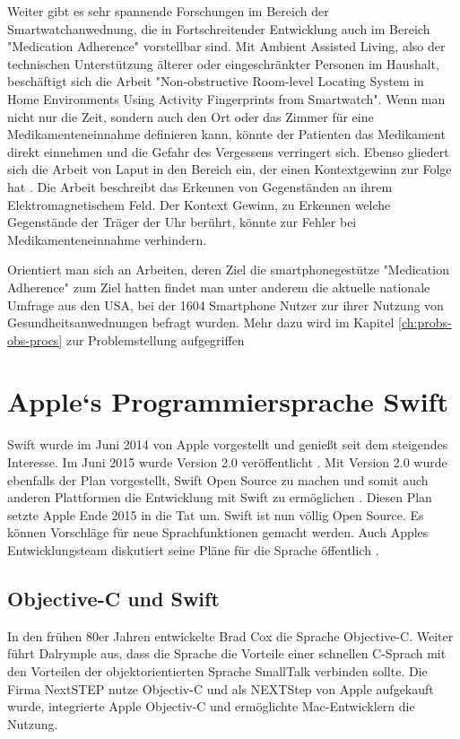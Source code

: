 Weiter gibt es sehr spannende Forschungen im Bereich der Smartwatchanwednung, die in Fortschreitender Entwicklung auch im Bereich "Medication Adherence" vorstellbar sind. Mit Ambient Assisted Living, also der technischen Unterstützung älterer oder eingeschränkter Personen im Haushalt, beschäftigt sich die Arbeit "Non-obstructive Room-level Locating System in Home Environments Using Activity Fingerprints from Smartwatch"\cite{Lee:2015:NRL:2750858.2804272}. Wenn man nicht nur die Zeit, sondern auch den Ort oder das Zimmer für eine Medikamenteneinnahme definieren kann, könnte der Patienten das Medikament direkt einnehmen und die Gefahr des Vergessens verringert sich. Ebenso gliedert sich die Arbeit von Laput in den Bereich ein, der einen Kontextgewinn zur Folge hat \cite{Laput:2015:ETR:2807442.2807481}. Die Arbeit beschreibt das Erkennen von Gegenständen an ihrem Elektromagnetischem Feld. Der Kontext Gewinn, zu Erkennen welche Gegenstände der Träger der Uhr berührt, könnte zur Fehler bei Medikamenteneinnahme verhindern.

Orientiert man sich an Arbeiten, deren Ziel die smartphonegestütze "Medication Adherence" zum Ziel hatten findet man unter anderem die aktuelle nationale Umfrage \cite{Krebs-P:2015aa} aus den USA, bei der 1604 Smartphone Nutzer zur ihrer Nutzung von Gesundheitsanwednungen befragt wurden. Mehr dazu wird im Kapitel \ref{ch:probs-obs-procs} zur Problemstellung  aufgegriffen

\section{Apple`s Programmiersprache Swift}
Swift wurde im Juni 2014 von Apple vorgestellt und genießt seit dem steigendes Interesse. Im Juni 2015 wurde Version 2.0 veröffentlicht \cite{Apple:2014sp}. Mit Version 2.0 wurde ebenfalls der Plan vorgestellt, Swift Open Source zu machen und somit auch anderen Plattformen die Entwicklung mit Swift zu ermöglichen \cite{Apple:2014sp}. Diesen Plan setzte Apple Ende 2015 in die Tat um. Swift ist nun völlig Open Source. Es können Vorschläge für neue Sprachfunktionen gemacht werden. Auch Apples Entwicklungsteam diskutiert seine Pläne für die Sprache öffentlich \cite{Apple:2015swiftOpen}.

\subsection{Objective-C und Swift}
In den frühen 80er Jahren entwickelte Brad Cox die Sprache Objective-C\cite{Dalrymple:2009aa}. Weiter führt Dalrymple aus, dass die Sprache  die Vorteile einer schnellen C-Sprach mit den Vorteilen der objektorientierten Sprache SmallTalk verbinden sollte. Die Firma NextSTEP nutze Objectiv-C und als NEXTStep von Apple aufgekauft wurde, integrierte Apple Objectiv-C und ermöglichte Mac-Entwicklern die Nutzung.

